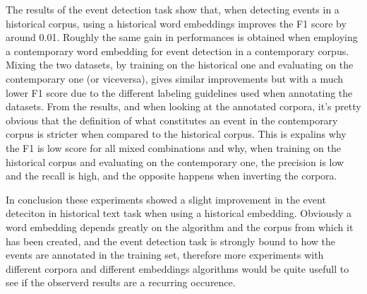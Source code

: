 \documentclass[runningheads]{llncs}
\begin{document}
The results of the event detection task show that, when detecting events in a historical corpus, using a historical word embeddings improves the F1 score by around 0.01. Roughly the same gain in performances is obtained when employing a contemporary word embedding for event detection in a contemporary corpus. Mixing the two datasets, by training on the historical one and evaluating on the contemporary one (or viceversa), gives similar improvements but with a much lower F1 score due to the different labeling guidelines used when annotating the datasets. From the results, and when looking at the annotated corpora, it's pretty obvious that the definition of what constitutes an event in the contemporary corpus is stricter when compared to the historical corpus. This is expalins why the F1 is low score for all mixed combinations and why, when training on the historical corpus and evaluating on the contemporary one, the precision is low and the recall is high, and the opposite happens when inverting the corpora. 

In conclusion these experiments showed a slight improvement in the event deteciton in historical text task when using a historical embedding. Obviously a word embedding depends greatly on the algorithm and the corpus from which it has been created, and the event detection task is strongly bound to how the events are annotated in the training set, therefore more experiments with different corpora and different embeddings algorithms would be quite usefull to see if the observerd results are a recurring occurence.


\newpage


%




\end{document}
